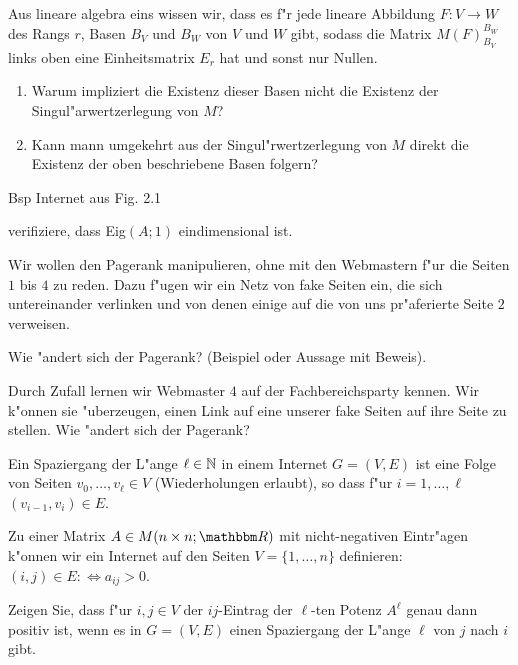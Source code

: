 \documentclass[a4,11pt]{article}
\begin{document}
\vspace*{-17mm}
{
\kopf
}



\begin{aufgabe}[4 Punkte]
Aus lineare algebra eins wissen wir, dass es f"r jede lineare Abbildung $F : V \to W$ des Rangs $r$, Basen $B_V$ und $B_W$ von $V$ und $W$ gibt, sodass die Matrix $M(F)_{B_V}^{B_W}$ links oben eine Einheitsmatrix $E_r$ hat und sonst nur Nullen. 
\begin{enumerate}
\item
Warum impliziert die Existenz dieser Basen nicht die Existenz der Singul"arwertzerlegung von $M$?
\item
Kann mann umgekehrt aus der Singul"rwertzerlegung von $M$ direkt die Existenz der oben beschriebene Basen folgern?
\end{enumerate}
\end{aufgabe}

\begin{aufgabe}[4 Punkte]
  Bsp Internet aus Fig. 2.1

  verifiziere, dass Eig$(A;1)$ eindimensional ist.

  Wir wollen den Pagerank manipulieren, ohne mit den Webmastern f"ur
  die Seiten $1$ bis $4$ zu reden. Dazu f"ugen wir ein Netz von fake
  Seiten ein, die sich untereinander verlinken und von denen einige
  auf die von uns pr"aferierte Seite $2$ verweisen.

  Wie "andert sich der Pagerank? (Beispiel oder Aussage mit Beweis).

  Durch Zufall lernen wir Webmaster $4$ auf der Fachbereichsparty
  kennen. Wir k"onnen sie "uberzeugen, einen Link auf eine unserer
  fake Seiten auf ihre Seite zu stellen. Wie "andert sich der Pagerank?
  
  
\end{aufgabe}


\begin{aufgabe}[4 Punkte]
Ein Spaziergang der L"ange $\ell \in \mathbb N$ in einem Internet $G=(V,E)$ ist
eine Folge von Seiten $v_0, \ldots, v_\ell \in V$ (Wiederholungen
erlaubt), so dass f"ur $i=1, \ldots, \ell$ $(v_{i-1},v_i) \in E$.

Zu einer Matrix $A \in M(n \times n; \R)$ mit nicht-negativen
Eintr"agen k"onnen wir ein Internet auf den Seiten $V = \{ 1, \ldots,
n \}$ definieren: $(i,j) \in E :\Leftrightarrow a_{ij} > 0$.

Zeigen Sie, dass f"ur $i,j \in V$ der $ij$-Eintrag der $\ell$-ten
Potenz $A^\ell$ genau dann positiv ist, wenn es in $G=(V,E)$ einen
Spaziergang der L"ange $\ell$ von $j$ nach $i$ gibt.
  
\end{aufgabe}
\end{document}
